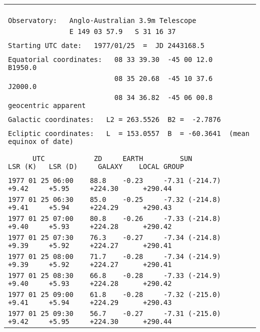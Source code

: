 \begin{center}
\begin{tabular}{|l|}
\hline
\verb|                                                                                                                                    |\\
\verb|Observatory:   Anglo-Australian 3.9m Telescope|\\
\verb|               E 149 03 57.9   S 31 16 37|\\
\\
\verb|Starting UTC date:   1977/01/25  =  JD 2443168.5|\\
\\ 
\verb|Equatorial coordinates:   08 33 39.30  -45 00 12.0   B1950.0|\\
\verb|                          08 35 20.68  -45 10 37.6   J2000.0|\\
\verb|                          08 34 36.82  -45 06 00.8   geocentric apparent|\\
\\ 
\verb|Galactic coordinates:   L2 = 263.5526  B2 =  -2.7876|\\
\\ 
\verb|Ecliptic coordinates:   L  = 153.0557  B  = -60.3641  (mean equinox of date)|\\
\\ 
\\
\verb|      UTC            ZD     EARTH         SUN            LSR (K)   LSR (D)     GALAXY    LOCAL GROUP|\\
\\
\verb|1977 01 25 06:00    88.8    -0.23     -7.31 (-214.7)      +9.42     +5.95     +224.30      +290.44|\\
\verb|1977 01 25 06:30    85.0    -0.25     -7.32 (-214.8)      +9.41     +5.94     +224.29      +290.43|\\
\verb|1977 01 25 07:00    80.8    -0.26     -7.33 (-214.8)      +9.40     +5.93     +224.28      +290.42|\\
\verb|1977 01 25 07:30    76.3    -0.27     -7.34 (-214.8)      +9.39     +5.92     +224.27      +290.41|\\
\verb|1977 01 25 08:00    71.7    -0.28     -7.34 (-214.9)      +9.39     +5.92     +224.27      +290.41|\\
\verb|1977 01 25 08:30    66.8    -0.28     -7.33 (-214.9)      +9.40     +5.93     +224.28      +290.42|\\
\verb|1977 01 25 09:00    61.8    -0.28     -7.32 (-215.0)      +9.41     +5.94     +224.29      +290.43|\\
\verb|1977 01 25 09:30    56.7    -0.27     -7.31 (-215.0)      +9.42     +5.95     +224.30      +290.44|\\

\end{tabular}
\end{center}
